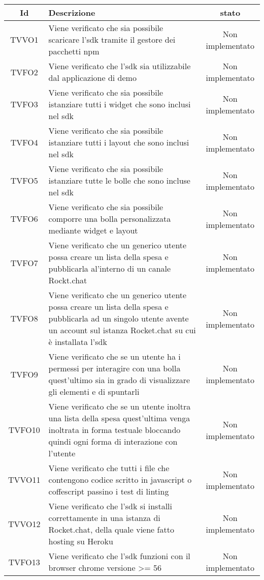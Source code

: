 \begin{center}
	\begin{longtable}{|c|>{\centering}m{10cm}|c|}\hline
		Id & Descrizione & stato \\ \hline
		TVVO1 & Viene verificato che sia possibile scaricare l'sdk tramite il gestore dei pacchetti npm & Non implementato \\ \hline
		TVFO2 & Viene verificato che l'sdk sia utilizzabile dal applicazione di demo & Non implementato \\ \hline
		TVFO3 & Viene verificato che sia possibile istanziare tutti i widget che sono inclusi nel sdk & Non implementato \\ \hline
		TVFO4 & Viene verificato che sia possibile istanziare tutti i layout che sono inclusi nel sdk & Non implementato \\ \hline
		TVFO5 & Viene verificato che sia possibile istanziare tutte le bolle che sono incluse nel sdk & Non implementato \\ \hline
		TVFO6 & Viene verificato che sia possibile comporre una bolla personalizzata mediante widget e layout & Non implementato \\ \hline
		TVFO7 & Viene verificato che un generico utente possa creare un lista della spesa e pubblicarla al'interno di un canale Rockt.chat & Non implementato \\ \hline
		TVFO8 & Viene verificato che un generico utente possa creare un lista della spesa e pubblicarla ad un singolo utente avente un account sul istanza Rocket.chat su cui è installata l'sdk & Non implementato \\ \hline
		TVFO9 & Viene verificato che se un utente ha i permessi per interagire con una bolla quest'ultimo sia in grado di visualizzare gli elementi e di spuntarli & Non implementato \\ \hline
		TVFO10 & Viene verificato che se un utente inoltra una lista della spesa quest'ultima venga inoltrata in forma testuale bloccando quindi ogni forma di interazione con l'utente & Non implementato \\ \hline
		TVVO11 & Viene verificato che tutti i file che contengono codice scritto in javascript o coffescript passino i test di linting & Non implementato \\ \hline
		TVVO12 & Viene verificato che l'sdk si installi correttamente in una istanza di Rocket.chat, della quale viene fatto hosting su Heroku & Non implementato \\ \hline
		TVFO13 & Viene verificato che l'sdk funzioni con il browser chrome versione >= 56 & Non implementato \\ \hline

\end{longtable}
\end{center}
